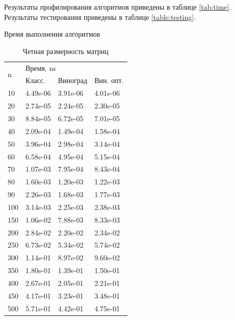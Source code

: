 Результаты профилирования алгоритмов приведены в таблице \ref{tab:time}. Результаты тестирования приведены в таблице \ref{table:testing}.
\begin{table}[ht!]
	\captionsetup{singlelinecheck = false, justification=raggedleft}
	\caption{Время выполнения алгоритмов}
	\renewcommand{\arraystretch}{1.4}
	\begin{subtable}[ht!]{0.45\textwidth}
		\centering
		\caption{Четная размерность матриц}
		\begin{tabular}{||l|l|l|l||}
			\hline
			\multirow{2}{*}{n} & \multicolumn{3}{l||}{Время, ns} \\ \cline{2-4} 
			&  Класс. & Виноград & Вин. опт. \\ \hline\hline
			10 & 4.49e-06 & 3.91e-06 & 4.01e-06 \\ \hline 
			20 & 2.74e-05 & 2.24e-05 & 2.30e-05 \\ \hline 
			30 & 8.84e-05 & 6.72e-05 & 7.01e-05 \\ \hline 
			40 & 2.09e-04 & 1.49e-04 & 1.58e-04 \\ \hline 
			50 & 3.96e-04 & 2.98e-04 & 3.14e-04 \\ \hline 
			60 & 6.58e-04 & 4.95e-04 & 5.15e-04 \\ \hline 
			70 & 1.07e-03 & 7.95e-04 & 8.43e-04 \\ \hline 
			80 & 1.60e-03 & 1.20e-03 & 1.22e-03 \\ \hline 
			90 & 2.26e-03 & 1.68e-03 & 1.77e-03 \\ \hline 
			100 & 3.14e-03 & 2.25e-03 & 2.38e-03 \\ \hline 
			150 & 1.06e-02 & 7.88e-03 & 8.33e-03 \\ \hline 
			200 & 2.84e-02 & 2.20e-02 & 2.34e-02 \\ \hline 
			250 & 6.73e-02 & 5.34e-02 & 5.74e-02 \\ \hline 
			300 & 1.14e-01 & 8.97e-02 & 9.60e-02 \\ \hline 
			350 & 1.80e-01 & 1.39e-01 & 1.50e-01 \\ \hline 
			400 & 2.67e-01 & 2.05e-01 & 2.21e-01 \\ \hline 
			450 & 4.17e-01 & 3.23e-01 & 3.48e-01 \\ \hline 
			500 & 5.71e-01 & 4.42e-01 & 4.75e-01 \\ \hline 
		\end{tabular}
		\label{tab:odd}
	\end{subtable}
	\hfill
	\begin{subtable}[ht!]{0.45\textwidth}
		\centering

\end{subtable}
\end{table}
